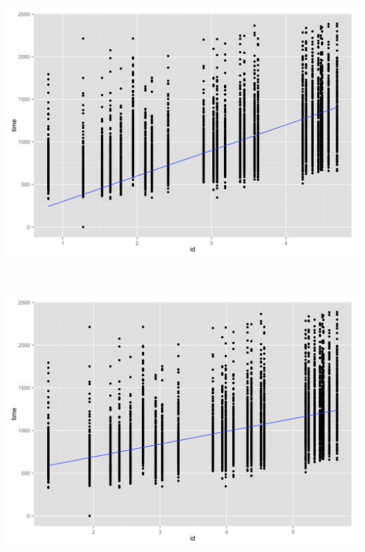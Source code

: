\begin{minipage}{\linewidth}
	\begin{minipage}[b]{0.45\linewidth}
		\includegraphics[width=\textwidth]{images/plots/plot_model_welford}
		\label{fig:welford_affine_line}
	\end{minipage}
	\begin{minipage}[b]{0.1\linewidth}
	~
	\end{minipage}
	\begin{minipage}[b]{0.45\linewidth}
		\includegraphics[width=\textwidth]{images/plots/plot_model_fitt}
		\label{fig:fitt_affine_line}
	\end{minipage}

\end{minipage}
